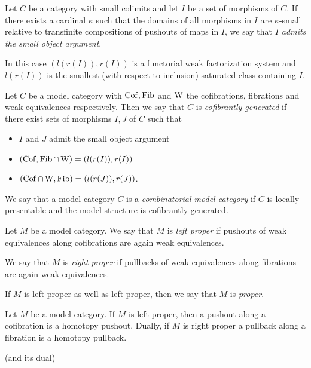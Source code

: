 \begin{thm}[Small Object Argument] %
    Let $C$ be a category with small colimits and let $I$ be a set of morphisms of $C$.
    If there exists a cardinal $\kappa$ such that the domains of all morphisms in $I$ are $\kappa$-small relative to transfinite compositions of pushouts of maps in $I$, we say that \emph{$I$ admits the small object argument}.
    
    In this case $(l(r(I)),r(I))$ is a functorial weak factorization system and $l(r(I))$ is the smallest (with respect to inclusion) saturated class containing $I$.
\end{thm}
\begin{reference}
    \cite[Theorem 2.1.14]{hovey2007model}
\end{reference}
\begin{definition}
    Let $C$ be a model category with $\operatorname{Cof},\operatorname{Fib}$ and $\operatorname{W}$ the cofibrations, fibrations and weak equivalences respectively.
    Then we say that $C$ is \emph{cofibrantly generated} if there exist sets of morphisms $I,J$ of $C$ such that
    \begin{itemize}
        \item $I$ and $J$ admit the small object argument
        \item $(\operatorname{Cof},\operatorname{Fib}\cap\operatorname{W})=(l(r(I)),r(I))$
        \item $(\operatorname{Cof}\cap\operatorname{W},\operatorname{Fib})=(l(r(J)),r(J))$.
    \end{itemize} 
\end{definition}
\begin{definition}
    We say that a model category $C$ is a \emph{combinatorial model category} if $C$ is locally presentable and the model structure is cofibrantly generated.
\end{definition}
\begin{definition}[Properness] %
    Let $M$ be a model category.
    We say that $M$ is \emph{left proper} if pushouts of weak equivalences along cofibrations are again weak equivalences.
    
    We say that $M$ is \emph{right proper} if pullbacks of weak equivalences along fibrations are again weak equivalences.
    
    If $M$ is left proper as well as left proper, then we say that $M$ is \emph{proper}.
\end{definition}
\begin{prop}
    Let $M$ be a model category.
    If $M$ is left proper, then a pushout along a cofibration is a homotopy pushout.
    Dually, if $M$ is right proper a pullback along a fibration is a homotopy pullback.
    \begin{reference}
        \cite[Proposition A.2.4.4]{HTT} (and its dual)
    \end{reference}
\end{prop}
